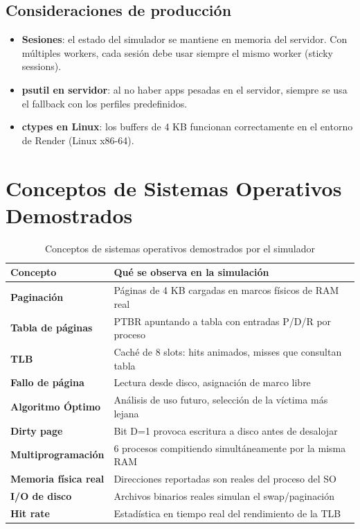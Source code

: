 \documentclass[12pt,a4paper]{article}
\begin{document}
\subsection{Consideraciones de producción}

\begin{itemize}[leftmargin=1.5cm]
  \item \textbf{Sesiones}: el estado del simulador se mantiene en memoria del servidor.
        Con múltiples workers, cada sesión debe usar siempre el mismo worker (sticky sessions).
  \item \textbf{psutil en servidor}: al no haber apps pesadas en el servidor, siempre se usa
        el fallback con los perfiles predefinidos.
  \item \textbf{ctypes en Linux}: los buffers de 4 KB funcionan correctamente en el entorno
        de Render (Linux x86-64).
\end{itemize}

\newpage

\section{Conceptos de Sistemas Operativos Demostrados}

\begin{table}[H]
\centering
\begin{tabular}{>{\bfseries}lp{9cm}}
\toprule
Concepto & Qué se observa en la simulación \\
\midrule
Paginación           & Páginas de 4 KB cargadas en marcos físicos de RAM real \\
Tabla de páginas     & PTBR apuntando a tabla con entradas P/D/R por proceso \\
TLB                  & Caché de 8 slots: hits animados, misses que consultan tabla \\
Fallo de página      & Lectura desde disco, asignación de marco libre \\
Algoritmo Óptimo     & Análisis de uso futuro, selección de la víctima más lejana \\
Dirty page           & Bit D=1 provoca escritura a disco antes de desalojar \\
Multiprogramación    & 6 procesos compitiendo simultáneamente por la misma RAM \\
Memoria física real  & Direcciones reportadas son reales del proceso del SO \\
I/O de disco         & Archivos binarios reales simulan el swap/paginación \\
Hit rate             & Estadística en tiempo real del rendimiento de la TLB \\
\bottomrule
\end{tabular}
\caption{Conceptos de sistemas operativos demostrados por el simulador}
\end{table}
\end{document}
